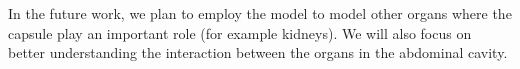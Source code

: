 \documentclass{llncs}
\begin{document}
In the future work, we plan to employ the model to model other organs where the capsule play an important role
(for example kidneys). We will also focus on better understanding the interaction between the organs in the abdominal 
cavity. 

%

%
%



\end{document}
